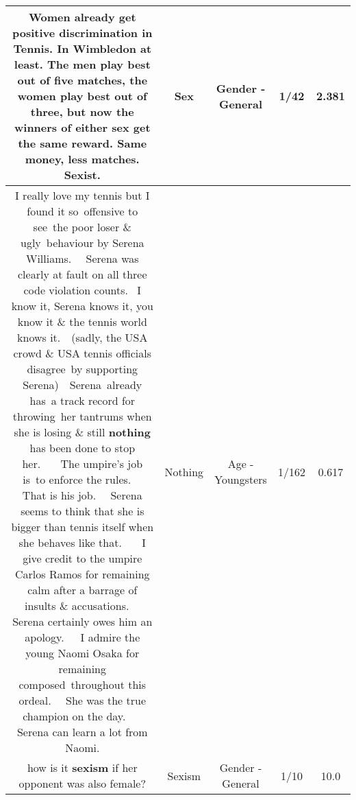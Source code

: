 \documentclass[11pt]{article}
\newlength\mylength
\begin{document}
\begin{center}
\begin{longtable}{|C{.65\mylength}|C{.30\mylength}|C{.12\mylength}|C{.12\mylength}|C{.12\mylength}|}
  \small Women already get positive discrimination in Tennis. In Wimbledon at least. The men play best out of five matches, the women play best out of three, but now the winners of either \textbf{sex} get the same reward. Same money, less matches. Sexist.\normalsize   & Sex & Gender - General & 1/42 & 2.381 \\  \hline
  \small I really love my tennis but I found it so offensive to see the poor loser \& ugly behaviour by Serena Williams.   Serena was clearly at fault on all three code violation counts.  I know it, Serena knows it, you know it \& the tennis world knows it.  (sadly, the USA crowd \& USA tennis officials disagree by supporting Serena)  Serena already has a track record for throwing her tantrums when she is losing \& still \textbf{nothing} has been done to stop her.    The umpire's job is to enforce the rules.   That is his job.   Serena seems to think that she is bigger than tennis itself when she behaves like that.    I give credit to the umpire Carlos Ramos for remaining calm after a barrage of insults \& accusations.   Serena certainly owes him an apology.   I admire the young Naomi Osaka for remaining composed throughout this ordeal.   She was the true champion on the day.    Serena can learn a lot from Naomi.\normalsize   & Nothing & Age - Youngsters & 1/162 & 0.617 \\  \hline
  \small how is it \textbf{sexism} if her opponent was also female?\normalsize   & Sexism & Gender - General & 1/10 & 10.0 \\  \hline

\end{longtable}
\end{center}
\end{document}
